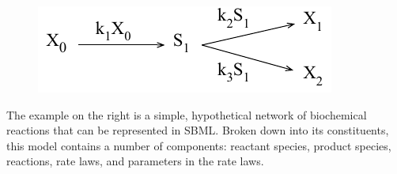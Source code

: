 \documentclass[10pt]{cekarticle}
\newcommand{\changed}[1]{\textcolor{BrickRed}{#1}}
\begin{document}
\begin{figure}
\begin{center}
\vspace*{-2ex}
\includegraphics[scale = 0.85]{example-network}
\end{center}
\end{figure}
\changed{The example on the right is a simple, hypothetical network of
  biochemical reactions that can be represented in SBML.}  Broken down into
its constituents, this model contains a number of components: reactant
species, product species, reactions, rate laws, and parameters in the rate
laws.
\end{document}
